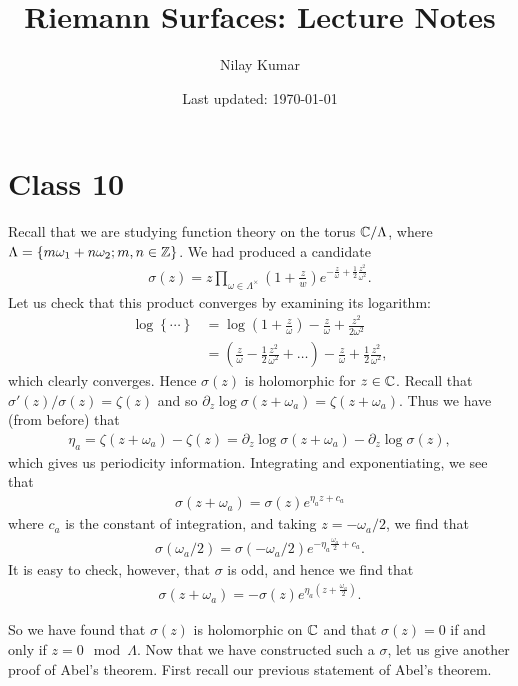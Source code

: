\documentclass{../mathnotes}
\title{Riemann Surfaces: Lecture Notes}
\author{Nilay Kumar}
\date{Last updated: \today}
\begin{document}
\maketitle


\section*{Class 10}

Recall that we are studying function theory on the torus $\mathbb{C}/\Lambda$, where $\Lambda=\left\{ m\omega_1+n\omega_2; m,n\in\mathbb{Z} \right\}$.
We had produced a candidate
\begin{align*}
    \sigma(z)=z\prod_{\omega\in\Lambda^\times}\left( 1+\frac{z}{w} \right)e^{-\frac{z}{\omega}+\frac{1}{2}\frac{z^2}{\omega^2}}.
\end{align*}
Let us check that this product converges by examining its logarithm:
\begin{align*}
    \log\left\{ \cdots \right\}&=\log(1+\frac{z}{\omega})-\frac{z}{\omega}+\frac{z^2}{2\omega^2}\\
    &=\left( \frac{z}{\omega}-\frac{1}{2}\frac{z^2}{\omega^2}+\ldots \right)-\frac{z}{\omega}+\frac{1}{2}\frac{z^2}{\omega^2},
\end{align*}
which clearly converges. Hence $\sigma(z)$ is holomorphic for $z\in\mathbb{C}$. Recall that $\sigma'(z)/\sigma(z)=\zeta(z)$ and so $\partial_z\log\sigma(z+\omega_a)=\zeta(z+\omega_a)$.
Thus we have (from before) that
\begin{align*}
    \eta_a=\zeta(z+\omega_a)-\zeta(z)=\partial_z\log\sigma(z+\omega_a)-\partial_z\log\sigma(z),
\end{align*}
which gives us periodicity information. Integrating and exponentiating, we see that
\begin{align*}
    \sigma(z+\omega_a)=\sigma(z)e^{\eta_az+c_a}
\end{align*}
where $c_a$ is the constant of integration, and taking $z=-\omega_a/2$, we find that
\begin{align*}
    \sigma(\omega_a/2)=\sigma(-\omega_a/2)e^{-\eta_a\frac{\omega_a}{2}+c_a}.
\end{align*}
It is easy to check, however, that $\sigma$ is odd, and hence we find that
\begin{align*}
    \sigma(z+\omega_a)=-\sigma(z)e^{\eta_a(z+\frac{\omega_a}{2})}.
\end{align*}

So we have found that $\sigma(z)$ is holomorphic on $\mathbb{C}$ and that $\sigma(z)=0$ if and only if $z=0\mod\Lambda$.
Now that we have constructed such a $\sigma$, let us give another proof of Abel's theorem. First recall our previous statement of
Abel's theorem.
\end{document}
